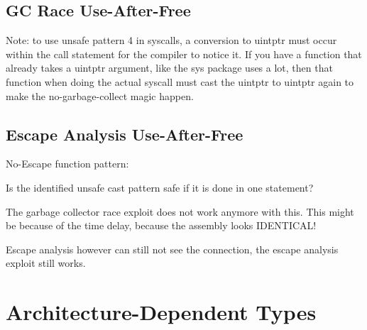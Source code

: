 
\subsection{GC Race Use-After-Free}\label{subsec:unsafe-security-problems:slice-casts:gc-race}

Note: to use unsafe pattern 4 in syscalls, a conversion to uintptr must occur within the call statement for the compiler
to notice it.
If you have a function that already takes a uintptr argument, like the sys package uses a lot, then that function when
doing the actual syscall must cast the uintptr to uintptr again to make the no-garbage-collect magic happen.






\subsection{Escape Analysis Use-After-Free}\label{subsec:unsafe-security-problems:slice-casts:escape-analysis}

No-Escape function pattern:



Is the identified unsafe cast pattern safe if it is done in one statement?



The garbage collector race exploit does not work anymore with this.
This might be because of the time delay, because the assembly looks IDENTICAL!

Escape analysis however can still not see the connection, the escape analysis exploit still works.



\section{Architecture-Dependent Types}\label{sec:unsafe-security-problems:architecture-dependent-types}



